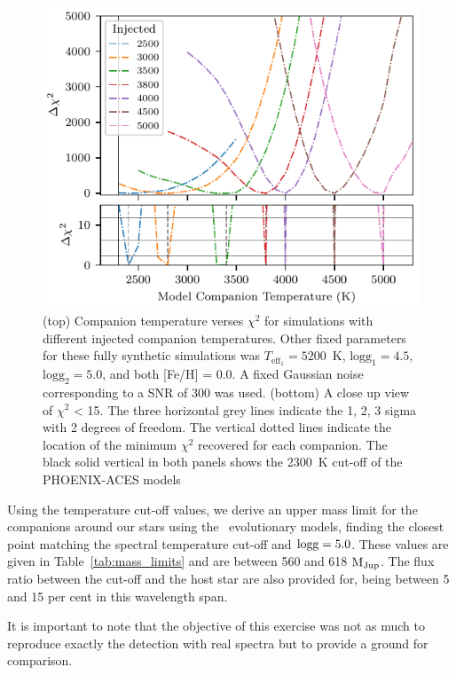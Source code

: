 \documentclass[fleqn,usenatbib]{mnras}
\newcommand*\bl{\color{blue}}
\begin{document}
    
    \begin{figure}
        \centering
        \includegraphics[width=0.95\hsize]{images/fig8.pdf}
        \caption{(top) Companion temperature verses \(\chi^2\) for simulations with different injected companion temperatures. Other fixed parameters for these fully synthetic simulations was \(T_{\textrm{eff}_1}=5200\)~K, \(\textrm{logg}_1=4.5\), \(\textrm{logg}_2=5.0\), and both [Fe/H] = 0.0. A fixed Gaussian noise corresponding to a SNR of 300 was used.
        (bottom) A close up view of \(\chi^2\) < 15. The three horizontal grey lines indicate the 1, 2, 3 sigma with 2 degrees of freedom. The vertical dotted lines indicate the location of the minimum \(\chi^2\) recovered for each companion. The black solid vertical in both panels shows the 2300~K cut-off of the PHOENIX-ACES models}
        \label{fig:injection_shape}
    \end{figure}
    
    
    
    
    Using the temperature cut-off values, we derive an upper mass limit for the companions around our stars using the~\citet{baraffe_new_2015} evolutionary models, finding the closest point matching the spectral temperature cut-off and \(\rm logg=5.0\). These values are given in Table~\ref{tab:mass_limits} and are between 560 and 618 \(\rm M_{Jup}\). The flux ratio between the cut-off and the host star are also provided for, being between 5 and 15 per cent in this wavelength span. 
    
    {\bl It is important to note that the objective of this exercise was not as much to reproduce exactly the detection with real spectra but to provide a ground for comparison.}
    
\end{document}
